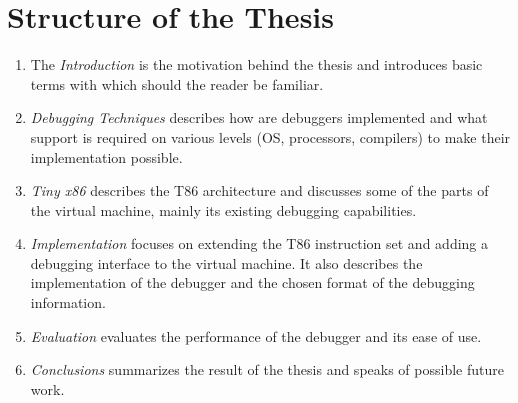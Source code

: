\section{Structure of the Thesis}
\begin{enumerate}
    \item The \textit{Introduction} is the motivation behind the thesis and
        introduces basic terms with which should the reader be familiar.
    \item \textit{Debugging Techniques} describes how are debuggers implemented
        and what support is required on various levels (OS, processors,
        compilers) to make their implementation possible.
    \item \textit{Tiny x86} describes the T86 architecture and discusses some
        of the parts of the virtual machine, mainly its existing debugging
        capabilities.
    \item \textit{Implementation} focuses on extending the T86 instruction set
        and adding a debugging interface to the virtual machine. It also
        describes the implementation of the debugger and the chosen format of
        the debugging information.
    \item \textit{Evaluation} evaluates the performance of the debugger and its
        ease of use.
    \item \textit{Conclusions} summarizes the result of the thesis and speaks
        of possible future work.
\end{enumerate}
